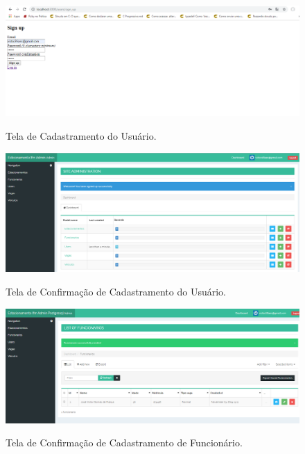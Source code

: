 \begin{figure}[h]
	\caption{Tela de Cadastramento do Usuário.}
	
	\centering %
	\includegraphics[scale=0.45]{Figs/signUp_projetoTCC.png} %
	\label{figura:signUp_projetoTCC}
\end{figure}

\begin{figure}[h]
	\caption{Tela de Confirmação de Cadastramento do Usuário.}
	
	\centering %
	\includegraphics[scale=0.45]{Figs/signedUpSuccessfully.png} %
	\label{figura:signedUpSuccessfully}
\end{figure}

\begin{figure}[h]
	\caption{Tela de Confirmação de Cadastramento de Funcionário.}
	
	\centering %
	\includegraphics[scale=0.45]{Figs/funcionarioSuccessfullyCreated.png} %
	\label{figura:funcionarioSuccessfullyCreated}
\end{figure}

